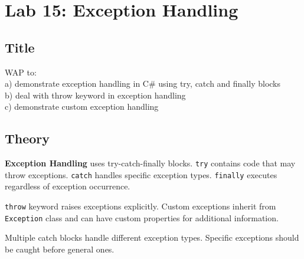 \documentclass[10pt,a4paper]{article}
\begin{document}
\section*{Lab 15: Exception Handling}

\subsection*{Title}
WAP to:\\
a) demonstrate exception handling in C\# using try, catch and finally blocks\\
b) deal with throw keyword in exception handling\\
c) demonstrate custom exception handling

\subsection*{Theory}
\textbf{Exception Handling} uses try-catch-finally blocks. \texttt{try} contains code that may throw exceptions. \texttt{catch} handles specific exception types. \texttt{finally} executes regardless of exception occurrence.

\texttt{throw} keyword raises exceptions explicitly. Custom exceptions inherit from \texttt{Exception} class and can have custom properties for additional information.

Multiple catch blocks handle different exception types. Specific exceptions should be caught before general ones.
\end{document}
